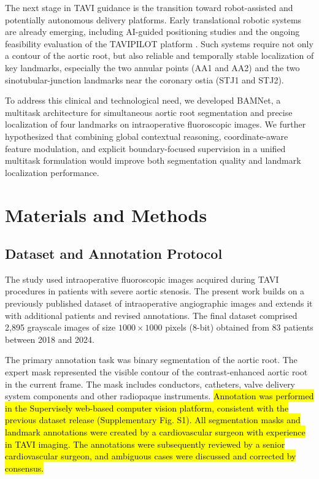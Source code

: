 \documentclass[utf8]{FrontiersinHarvard}
\begin{document}
The next stage in TAVI guidance is the transition toward robot-assisted
and potentially autonomous delivery platforms.
Early translational robotic systems are already emerging,
including AI-guided positioning studies and the ongoing feasibility evaluation
of the TAVIPILOT platform \citep{smits2025_autonomous,clinicaltrials_nct07152574}.
Such systems require not only a contour of the aortic root,
but also reliable and temporally stable localization of key landmarks,
especially the two annular points (AA1 and AA2)
and the two sinotubular-junction landmarks near the coronary ostia (STJ1 and STJ2).

To address this clinical and technological need, we developed BAMNet, a multitask architecture for simultaneous aortic root segmentation and 
precise localization of four landmarks on intraoperative fluoroscopic images. We further hypothesized that combining global contextual reasoning, 
coordinate-aware feature modulation, and explicit boundary-focused supervision in a unified multitask formulation would improve both segmentation 
quality and landmark localization performance.

\section{Materials and Methods}

\subsection{Dataset and Annotation Protocol}

The study used intraoperative fluoroscopic images acquired during TAVI procedures in patients with severe aortic stenosis. The present work builds 
on a previously published dataset of intraoperative angiographic images \citep{laptev2025_dataset} and extends it with additional patients and 
revised annotations. The final dataset comprised 2,895 grayscale images of size $1000 \times 1000$ pixels (8-bit) obtained from 83 patients between 2018 and 2024.

The primary annotation task was binary segmentation of the aortic root. The expert mask represented the visible contour of the contrast-enhanced 
aortic root in the current frame. The mask includes conductors, catheters, valve delivery system components and other radiopaque instruments. \hl{Annotation was performed in the Supervisely web-based computer vision platform, consistent with the previous 
dataset release (Supplementary Fig. S1). All segmentation masks and landmark annotations were created by a cardiovascular surgeon 
with experience in TAVI imaging. The annotations were subsequently reviewed by a senior cardiovascular surgeon, and ambiguous cases 
were discussed and corrected by consensus.}
\end{document}
